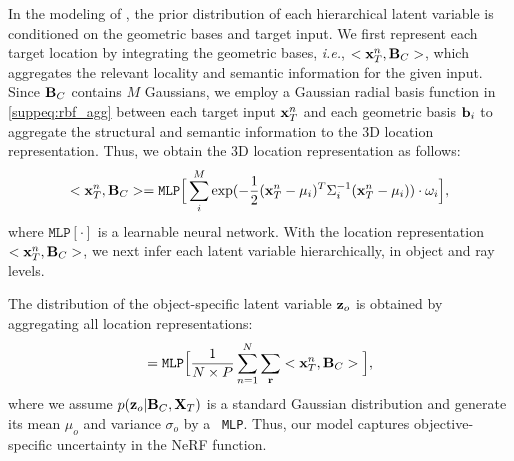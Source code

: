 In the modeling of {\method{}}, the prior distribution of each hierarchical latent variable is conditioned on the geometric bases and target input. 
We first represent each target location by integrating the geometric bases, \textit{i.e.}, $<{\bf{x}}_{T}^{n}, {\bf{B}}_C >$, which aggregates the relevant locality and semantic information for the given input. 
Since ${\bf{B}}_{C}$ contains $M$ Gaussians, we employ a Gaussian radial basis function in \cref{suppeq:rbf_agg} between each target input ${\bf{x}}_{T}^{ n}$ and each geometric basis ${\bf{b}}_i$ to aggregate the structural and semantic information to the 3D location representation. Thus, we obtain the 3D location representation as follows:
\begin{equation}
\label{suppeq:rbf_agg}
    <{\bf{x}}_{T}^{n}, {\bf{B}}_C > = \texttt{MLP}\Big[\sum_i^{M} \exp (-\frac{1}{2}({\bf{x}}_{T}^{n}-\mu_i)^T\Sigma_i^{-1}({\bf{x}}_{T}^{n}-\mu_i) ) \cdot \omega_i\Big],
\end{equation} 
where $\texttt{MLP}[\cdot]$ is a learnable neural network.
With the location representation $<{\bf{x}}_{T}^{n}, {\bf{B}}_C >$, we next infer each latent variable hierarchically, in object and ray levels. 

 The distribution of the object-specific latent variable ${\bf{z}}_o$ is obtained by aggregating all location representations:
\begin{equation}
    [\mu_{{o}}, \sigma_{{o}}] 
    = \texttt{MLP}\Big[\frac{1}{N \times P}\sum_{n = 1}^{N}\sum_{\mathbf{r}}
    <{\bf{x}}_{T}^{n}, {\bf{B}}_C >\Big],
\end{equation} 
where we assume $p({\bf{z}}_o | {\bf{B}}_C,  {\bf{X}}_T)$ is a standard Gaussian distribution and generate its mean $\mu_{o}$ and variance $\sigma_{o}$ by a ~\texttt{MLP}. 
Thus, our model captures objective-specific uncertainty in the NeRF function.


